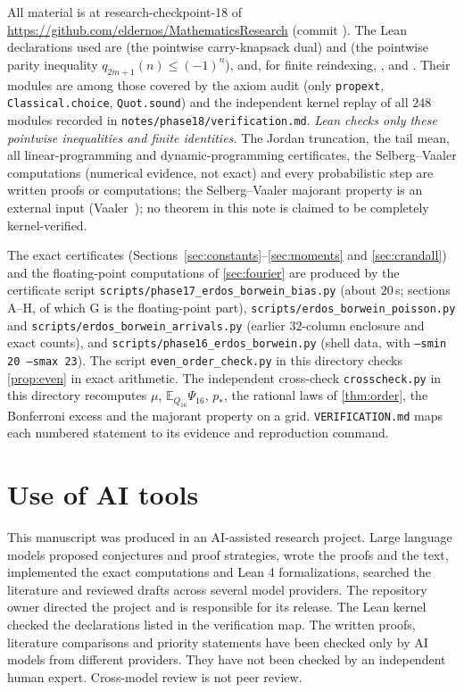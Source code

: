\documentclass[11pt]{article}
\newcommand{\Ex}{\mathbb E}
\begin{document}
All material is at research-checkpoint-18 of \url{https://github.com/eldernos/MathematicsResearch} (commit ). The Lean declarations used are  (the pointwise carry-knapsack dual) and  (the pointwise parity inequality $q_{2m+1}(n)\le(-1)^n$), and, for finite reindexing, ,  and . Their modules are among those covered by the axiom audit (only \texttt{propext}, \texttt{Classical.choice}, \texttt{Quot.sound}) and the independent kernel replay of all $248$ modules recorded in \texttt{notes/phase18/verification.md}. \emph{Lean checks only these pointwise inequalities and finite identities.} The Jordan truncation, the tail mean, all linear-programming and dynamic-programming certificates, the Selberg--Vaaler computations (numerical evidence, not exact) and every probabilistic step are written proofs or computations; the Selberg--Vaaler majorant property is an external input (Vaaler~\cite{vaaler1985}); no theorem in this note is claimed to be completely kernel-verified.

The exact certificates (Sections~\ref{sec:constants}--\ref{sec:moments} and \ref{sec:crandall}) and the floating-point computations of \cref{sec:fourier} are produced by the certificate script \texttt{scripts/phase17\_erdos\_borwein\_bias.py} (about $20$\,s; sections A--H, of which G is the floating-point part), \texttt{scripts/erdos\_borwein\_poisson.py} and \texttt{scripts/erdos\_borwein\_arrivals.py} (earlier $32$-column enclosure and exact counts), and \texttt{scripts/phase16\_erdos\_borwein.py} (shell data, with \texttt{--smin 20 --smax 23}). The script \texttt{even\_order\_check.py} in this directory checks \cref{prop:even} in exact arithmetic. The independent cross-check \texttt{crosscheck.py} in this directory recomputes $\mu$, $\Ex_{Q_{16}}\Psi_{16}$, $p_*$, the rational laws of \cref{thm:order}, the Bonferroni excess and the majorant property on a grid. \texttt{VERIFICATION.md} maps each numbered statement to its evidence and reproduction command.

\section{Use of AI tools}\label{sec:ai}

This manuscript was produced in an AI-assisted research project. Large language models proposed conjectures and proof strategies, wrote the proofs and the text, implemented the exact computations and Lean 4 formalizations, searched the literature and reviewed drafts across several model providers. The repository owner directed the project and is responsible for its release. The Lean kernel checked the declarations listed in the verification map. The written proofs, literature comparisons and priority statements have been checked only by AI models from different providers. They have not been checked by an independent human expert. Cross-model review is not peer review.



\end{document}
